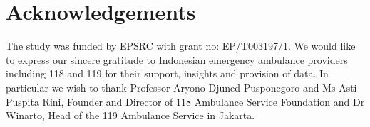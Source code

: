 \documentclass[preprint,12pt]{elsarticle}
\begin{document}






\section*{Acknowledgements}
The study was funded by EPSRC with grant no: EP/T003197/1. We would like to
express our sincere gratitude to Indonesian emergency ambulance providers
including 118 and 119 for their support, insights and provision of data. In
particular we wish to thank Professor Aryono Djuned Pusponegoro and Ms Asti
Puspita Rini, Founder and Director of 118 Ambulance Service Foundation and Dr
Winarto, Head of the 119 Ambulance Service in Jakarta.


\appendix
\end{document}

